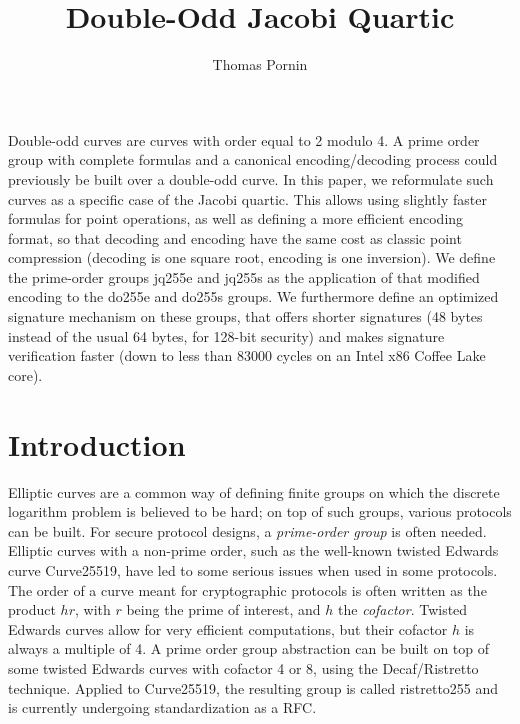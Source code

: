 \documentclass{llncs}
\makeatletter
\renewenvironment{abstract}{%
      \list{}{\advance\topsep by0.35cm\relax\small
      \leftmargin=1cm
      \labelwidth=\z@
      \listparindent=\z@
      \itemindent\listparindent
      \rightmargin\leftmargin}\item[\hskip\labelsep
                                    \textsf{\textbf{\abstractname}}]}
    {\endlist}
\makeatother
\begin{document}
\title{\textsf{Double-Odd Jacobi Quartic}}

\author{Thomas Pornin}

\maketitle
\noindent{}

\begin{abstract}
Double-odd curves are curves with order equal to 2 modulo 4. A prime
order group with complete formulas and a canonical encoding/decoding
process could previously be built over a double-odd curve. In this
paper, we reformulate such curves as a specific case of the Jacobi
quartic. This allows using slightly faster formulas for point
operations, as well as defining a more efficient encoding format, so
that decoding and encoding have the same cost as classic point
compression (decoding is one square root, encoding is one inversion). We
define the prime-order groups jq255e and jq255s as the application of
that modified encoding to the do255e and do255s groups. We furthermore
define an optimized signature mechanism on these groups, that offers
shorter signatures (48 bytes instead of the usual 64 bytes, for 128-bit
security) and makes signature verification faster (down to less than
83000 cycles on an Intel x86 Coffee Lake core).
\end{abstract}


\section{Introduction}

Elliptic curves are a common way of defining finite groups on which the
discrete logarithm problem is believed to be hard; on top of such
groups, various protocols can be built. For secure protocol designs, a
\emph{prime-order group} is often needed. Elliptic curves with a
non-prime order, such as the well-known twisted Edwards curve
Curve25519, have led to some serious issues when used in some
protocols\cite{CreJac2019}. The order of a curve meant for cryptographic
protocols is often written as the product $hr$, with $r$ being the prime
of interest, and $h$ the \emph{cofactor}. Twisted Edwards curves allow
for very efficient computations, but their cofactor $h$ is always a
multiple of 4. A prime order group abstraction can be built on top of
some twisted Edwards curves with cofactor 4 or 8, using the
Decaf/Ristretto technique\cite{RistrettoWeb,Ham2015}. Applied to
Curve25519, the resulting group is called ristretto255 and is currently
undergoing standardization as a RFC\cite{RistrettoDraft}.
\end{document}
